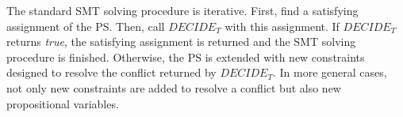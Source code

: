 \documentclass[review]{elsarticle}
\newcommand{\decidet}{\ensuremath{\mathit{DECIDE_T}}\xspace}
\newcommand\roni[1]{\nb{\textbf{Roni:}}{green}{#1}}
\newcommand\pavel[1]{\nb{\textbf{Pavel:}}{blue}{#1}}
\newcommand{\smt}{\ac{SMT}\xspace}
\newcommand{\ps}{\ac{PS}\xspace}
\newcommand{\true}{\textit{true}\xspace}
\begin{document}
The standard \smt solving procedure is iterative. First, find a satisfying assignment of the \ps. 
Then, call \decidet with this assignment. If \decidet returns \true, the satisfying assignment is returned and the \smt solving procedure is finished. 
Otherwise, the \ps is extended with new constraints designed to resolve the conflict returned by \decidet. 
In more general cases, not only new constraints are added to resolve a conflict but also new propositional variables.




\end{document}
